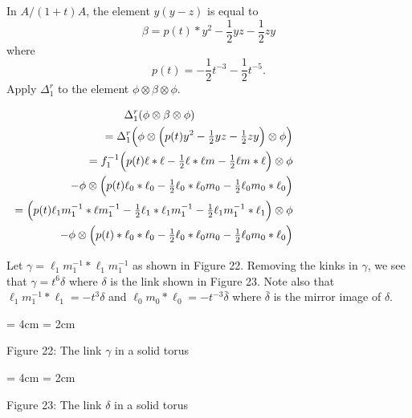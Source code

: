 \documentclass{slides}
\newcommand{\ot}{\otimes}
\begin{document}
\begin{slide}
In $A / (1+t) A$, the element $y(y-z)$ is equal to
$$\beta = p(t)*y^2 - \frac{1}{2} yz - \frac{1}{2} zy$$
where $$p(t) = - \frac{1}{2} t^{-3} - \frac{1}{2} t^{-5}.$$
Apply $\Delta^r_1$ to the element $\phi \ot \beta \ot \phi$.

\begin{eqnarray}
\Delta^r_1 ( \phi \ot \beta \ot \phi) \nonumber \\
& & \hspace{-6cm} =
\Delta^r_1 \Big( \phi \ot \Big( p(t) y^2 - {\textstyle \frac{1}{2}} yz - {\textstyle \frac{1}{2}} zy \Big) \ot \phi \Big) \nonumber \\
& & \hspace{-6cm} =  f_1^{-1} \Big( p(t) \ell*\ell - {\textstyle \frac{1}{2}} \ell * \ell m - {\textstyle \frac{1}{2}} \ell m * \ell \Big) \ot \phi \nonumber \\
& & \hspace{-5cm} - \phi \ot \Big( p(t) \ell_0 * \ell_0 - {\textstyle \frac{1}{2}} \ell_0 * \ell_0 m_0 - {\textstyle \frac{1}{2}} \ell_0 m_0 * \ell_0 \Big) \nonumber \\
& & \hspace{-6cm} = \Big( p(t) \ell_1 m_1^{-1} * \ell m_1^{-1} - {\textstyle \frac{1}{2}} \ell_1 * \ell_1 m_1^{-1}
- {\textstyle \frac{1}{2}} \ell_1 m_1^{-1} * \ell_1 \Big) \ot \phi \nonumber \\
& & \hspace{-5cm} - \phi \ot \Big( p(t)*\ell_0 * \ell_0 - {\textstyle \frac{1}{2}} \ell_0 * \ell_0 m_0 - {\textstyle \frac{1}{2}} \ell_0 m_0 * \ell_0 \Big) \nonumber
\end{eqnarray}
\end{slide}

\begin{slide}
Let $\gamma = \ell_1 m_1^{-1} * \ell_1 m_1^{-1}$ as shown in Figure 22.
Removing the kinks in $\gamma$, we see that $\gamma = t^6 \delta$ where $\delta$
is the link shown in Figure 23.  Note also that $\ell_1 m_1^{-1} * \ell_1 = -t^3 \delta$
and $\ell_0 m_0 * \ell_0 = -t^{-3} \bar{\delta}$ where $\bar{\delta}$ is the mirror image of
$\delta$.

  \begin{center}
    \epsfxsize = 4cm
    \epsfysize = 2cm

Figure 22:  The link $\gamma$ in a solid torus
  \end{center}

\vspace{2cm}

  \begin{center}
    \epsfxsize = 4cm
    \epsfysize = 2cm

Figure 23:  The link $\delta$ in a solid torus
  \end{center}
\end{slide}
\end{document}
